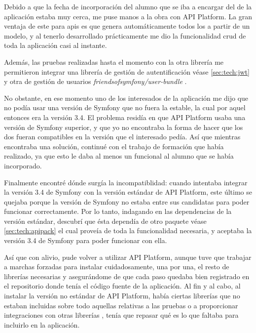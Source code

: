 Debido a que la fecha de incorporación del alumno que se iba a encargar del 
de la aplicación estaba muy cerca, me puse manos a la obra con API Platform. La
gran ventaja de este  para \gls{api}s es que
genera automáticamente todos los  a partir de un modelo,
y al tenerlo desarrollado prácticamente me dio la funcionalidad \gls{crud} de toda
la aplicación casi al instante.

Además, las pruebas realizadas hasta el momento con la otra librería me permitieron
integrar una librería de gestión de autentificación \textemdash véase \ref{sec:tech:jwt}
\textemdash y otra de gestión de usuarios \textemdash \textit{friendsofsymfony/user-bundle}
\textemdash.

No obstante, en ese momento uno de los interesados de la aplicación me dijo que no
podía usar una versión de Symfony que no fuera la estable, la cual por aquel
entonces era la versión 3.4. El problema residía en que API Platform usaba una
versión de Symfony superior, y que yo no encontraba la forma de hacer que
los dos  fueran compatibles en la versión que
el interesado pedía. Así que mientras encontraba una solución, continué con
el trabajo de formación que había realizado, ya que esto le daba al menos un
 funcional al alumno que se había incorporado.

Finalmente encontré dónde surgía la incompatiblidad: cuando intentaba integrar
la versión 3.4 de Symfony con la versión estándar de API Platform, este último
 se quejaba porque la versión de Symfony no
estaba entre sus candidatas para poder funcionar correctamente. Por lo tanto,
indagando en las dependencias de la versión estándar, descubrí que ésta
dependía de otro paquete \textemdash véase \ref{sec:tech:apipack} \textemdash el cual
proveía de toda la funcionalidad necesaria, y aceptaba la versión 3.4 de Symfony
para poder funcionar con ella.

Así que con alivio, pude volver a utilizar API Platform, aunque tuve que
trabajar a marchas forzadas para instalar cuidadosamente, una por una, el resto
de librerías necesarias y asegurándome de que cada paso quedaba bien registrado
en el repositorio donde tenía el código fuente de la aplicación. Al fin y al
cabo, al instalar la versión no estándar de API Platform, había ciertas librerías
que no estaban incluidas \textemdash sobre todo aquellas relativas a las pruebas
o a proporcionar integraciones con otras librerías \textemdash, tenía que repasar
qué es lo que faltaba para incluirlo en la aplicación.

